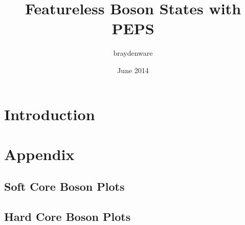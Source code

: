 \documentclass[11pt, letterpaper]{article}
\title{Featureless Boson States with PEPS}
\author{braydenware }
\date{June 2014}
\begin{document}
\maketitle

\section{Introduction}

\section{Appendix}
\subsection{Soft Core Boson Plots}









%
%

\subsection{Hard Core Boson Plots}








\end{document}

